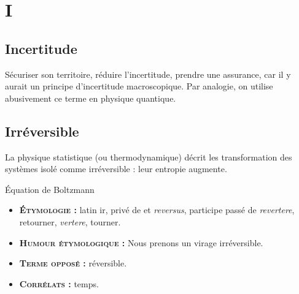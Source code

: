 \chapter{I}
\section{Incertitude}

Sécuriser son territoire, réduire l'incertitude,
prendre une assurance, car il y aurait un principe
d'incertitude macroscopique. Par analogie, on utilise 
abusivement ce terme en physique quantique.

\section{Irréversible}

La physique statistique (ou thermodynamique) décrit les transformation des systèmes isolé comme irréversible : leur entropie augmente.

Équation de Boltzmann

{\footnotesize
\begin{itemize}[leftmargin=1cm, label=, itemsep=1pt]
\item {\bf \textsc{Étymologie} :} latin ir, privé de et {\it reversus}, participe passé de {\it revertere}, retourner, {\it vertere}, tourner.
\item {\bf \textsc{Humour étymologique} :} Nous prenons un virage irréversible.
\item {\bf \textsc{Terme opposé} :} réversible.
\item {\bf \textsc{Corrélats} :} temps.
\end{itemize}
}
